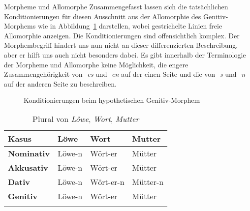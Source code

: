 \begin{Vertiefung}{Morpheme und Allomorphe}
Zusammengefasst lassen sich die tatsächlichen Konditionierungen für diesen Ausschnitt aus der Allomorphie des Genitiv-Morphems wie in Abbildung~\ref{fig:kondgensg} darstellen, wobei gestrichelte Linien freie Allomorphie anzeigen.
Die Konditionierungen sind offensichtlich komplex.
Der Morphembegriff hindert uns nun nicht an dieser differenzierten Beschreibung, aber er hilft uns auch nicht besonders dabei.
Es gibt innerhalb der Terminologie der Morpheme und Allomorphe keine Möglichkeit, die engere Zusammengehörigkeit von \textit{-es} und \textit{-en} auf der einen Seite und die von \textit{-s} und \textit{-n} auf der anderen Seite zu beschreiben.

\begin{figure}[!htbp]
  \centering
  \caption{Konditionierungen beim hypothetischen Genitiv-Morphem}
  \label{fig:kondgensg}
\end{figure}

\begin{table}[!htbp]
  \begin{tabular}{llll}
	\lsptoprule
    \textbf{Kasus} & \textbf{Löwe} & \textbf{Wort} & \textbf{Mutter} \\
    \midrule
     \textbf{Nominativ} & Löwe-n & Wört-er   & Mütter   \\
     \textbf{Akkusativ} & Löwe-n & Wört-er   & Mütter   \\
     \textbf{Dativ}     & Löwe-n & Wört-er-n & Mütter-n \\
     \textbf{Genitiv}   & Löwe-n & Wört-er   & Mütter   \\
    \lspbottomrule
  \end{tabular}
  \caption{Plural von \textit{Löwe}, \textit{Wort}, \textit{Mutter}}
  \label{tab:pluralbeispielmorpheme}
\end{table}



\end{Vertiefung}
